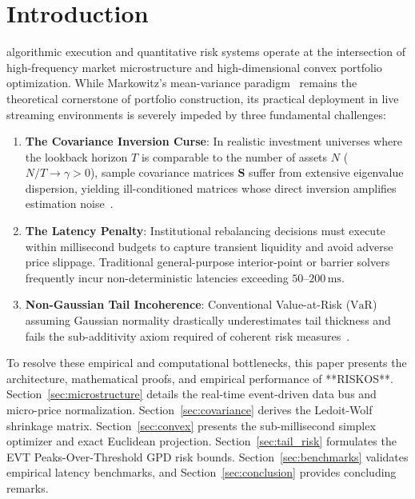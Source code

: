 \documentclass[10pt,journal,compsoc]{IEEEtran}
\begin{document}
\maketitle
\IEEEdisplaynontitleabstractindextext
\IEEEpeerreviewmaketitle

\section{Introduction}
 algorithmic execution and quantitative risk systems operate at the intersection of high-frequency market microstructure and high-dimensional convex portfolio optimization. While Markowitz's mean-variance paradigm~\cite{markowitz1952} remains the theoretical cornerstone of portfolio construction, its practical deployment in live streaming environments is severely impeded by three fundamental challenges:

\begin{enumerate}
    \item \textbf{The Covariance Inversion Curse}: In realistic investment universes where the lookback horizon $T$ is comparable to the number of assets $N$ ($N/T \to \gamma > 0$), sample covariance matrices $\mathbf{S}$ suffer from extensive eigenvalue dispersion, yielding ill-conditioned matrices whose direct inversion amplifies estimation noise~\cite{ledoit2004well}.
    \item \textbf{The Latency Penalty}: Institutional rebalancing decisions must execute within millisecond budgets to capture transient liquidity and avoid adverse price slippage. Traditional general-purpose interior-point or barrier solvers frequently incur non-deterministic latencies exceeding $50\text{--}200\,\text{ms}$.
    \item \textbf{Non-Gaussian Tail Incoherence}: Conventional Value-at-Risk ($\text{VaR}$) assuming Gaussian normality drastically underestimates tail thickness and fails the sub-additivity axiom required of coherent risk measures~\cite{rockafellar2000optimization}.
\end{enumerate}

To resolve these empirical and computational bottlenecks, this paper presents the architecture, mathematical proofs, and empirical performance of **RISKOS**. Section~\ref{sec:microstructure} details the real-time event-driven data bus and micro-price normalization. Section~\ref{sec:covariance} derives the Ledoit-Wolf shrinkage matrix. Section~\ref{sec:convex} presents the sub-millisecond simplex optimizer and exact Euclidean projection. Section~\ref{sec:tail_risk} formulates the EVT Peaks-Over-Threshold GPD risk bounds. Section~\ref{sec:benchmarks} validates empirical latency benchmarks, and Section~\ref{sec:conclusion} provides concluding remarks.
\end{document}
